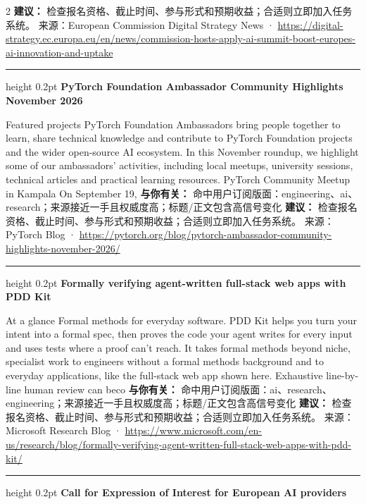 \documentclass[10.5pt]{ctexart}
\begin{document}
\begin{multicols}{2}
\textbf{建议：} 检查报名资格、截止时间、参与形式和预期收益；合适则立即加入任务系统。
{\footnotesize\color{ormuted} 来源：European Commission Digital Strategy News · \url{https://digital-strategy.ec.europa.eu/en/news/commission-hosts-apply-ai-summit-boost-europes-ai-innovation-and-uptake}}
\vspace{2mm}
\hrule height 0.2pt
\vspace{2mm}
{\large\bfseries PyTorch Foundation Ambassador Community Highlights November 2026}\par
Featured projects PyTorch Foundation Ambassadors bring people together to learn, share technical knowledge and contribute to PyTorch Foundation projects and the wider open-source AI ecosystem. In this November roundup, we highlight some of our ambassadors’ activities, including local meetups, university sessions, technical articles and practical learning resources. PyTorch Community Meetup in Kampala On September 19,
\textbf{与你有关：} 命中用户订阅版面：engineering、ai、research；来源接近一手且权威度高；标题/正文包含高信号变化
\textbf{建议：} 检查报名资格、截止时间、参与形式和预期收益；合适则立即加入任务系统。
{\footnotesize\color{ormuted} 来源：PyTorch Blog · \url{https://pytorch.org/blog/pytorch-ambassador-community-highlights-november-2026/}}
\vspace{2mm}
\hrule height 0.2pt
\vspace{2mm}
{\large\bfseries Formally verifying agent-written full-stack web apps with PDD Kit}\par
At a glance Formal methods for everyday software. PDD Kit helps you turn your intent into a formal spec, then proves the code your agent writes for every input and uses tests where a proof can’t reach. It takes formal methods beyond niche, specialist work to engineers without a formal methods background and to everyday applications, like the full-stack web app shown here. Exhaustive line-by-line human review can beco
\textbf{与你有关：} 命中用户订阅版面：ai、research、engineering；来源接近一手且权威度高；标题/正文包含高信号变化
\textbf{建议：} 检查报名资格、截止时间、参与形式和预期收益；合适则立即加入任务系统。
{\footnotesize\color{ormuted} 来源：Microsoft Research Blog · \url{https://www.microsoft.com/en-us/research/blog/formally-verifying-agent-written-full-stack-web-apps-with-pdd-kit/}}
\vspace{2mm}
\hrule height 0.2pt
\vspace{2mm}
{\large\bfseries Call for Expression of Interest for European AI providers}\par

\end{multicols}
\end{document}
